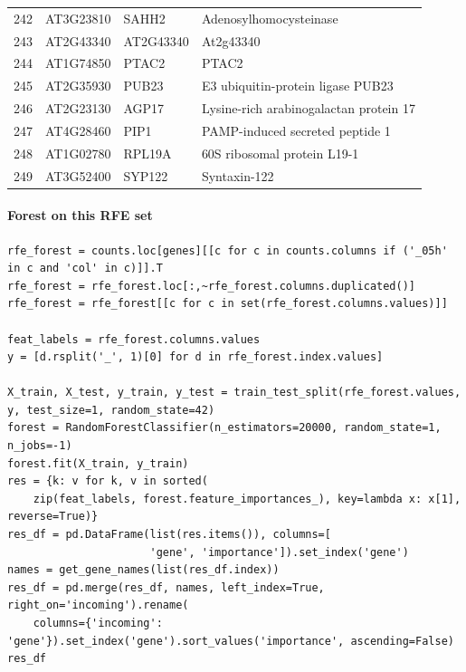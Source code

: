 \documentclass[11pt]{article}
\begin{document}
\begin{center}
\begin{tabular}{rlll}
242 & AT3G23810 & SAHH2 & Adenosylhomocysteinase\\
243 & AT2G43340 & AT2G43340 & At2g43340\\
244 & AT1G74850 & PTAC2 & PTAC2\\
245 & AT2G35930 & PUB23 & E3 ubiquitin-protein ligase PUB23\\
246 & AT2G23130 & AGP17 & Lysine-rich arabinogalactan protein 17\\
247 & AT4G28460 & PIP1 & PAMP-induced secreted peptide 1\\
248 & AT1G02780 & RPL19A & 60S ribosomal protein L19-1\\
249 & AT3G52400 & SYP122 & Syntaxin-122\\
\end{tabular}
\end{center}


\paragraph{Forest on this RFE set}
\label{sec:org9ddfa98}

\begin{verbatim}
rfe_forest = counts.loc[genes][[c for c in counts.columns if ('_05h' in c and 'col' in c)]].T
rfe_forest = rfe_forest.loc[:,~rfe_forest.columns.duplicated()]
rfe_forest = rfe_forest[[c for c in set(rfe_forest.columns.values)]]

feat_labels = rfe_forest.columns.values
y = [d.rsplit('_', 1)[0] for d in rfe_forest.index.values]

X_train, X_test, y_train, y_test = train_test_split(rfe_forest.values, y, test_size=1, random_state=42)
forest = RandomForestClassifier(n_estimators=20000, random_state=1, n_jobs=-1)
forest.fit(X_train, y_train)
res = {k: v for k, v in sorted(
    zip(feat_labels, forest.feature_importances_), key=lambda x: x[1], reverse=True)}
res_df = pd.DataFrame(list(res.items()), columns=[
                      'gene', 'importance']).set_index('gene')
names = get_gene_names(list(res_df.index))
res_df = pd.merge(res_df, names, left_index=True, right_on='incoming').rename(
    columns={'incoming': 'gene'}).set_index('gene').sort_values('importance', ascending=False)
res_df
\end{verbatim}
\end{document}
